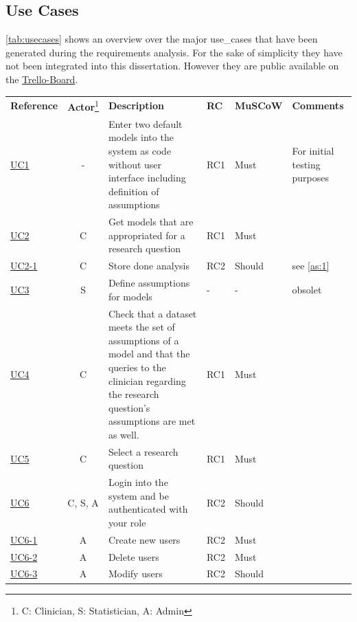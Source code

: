 \subsection{Use Cases}
\label{sub:use_cases}
\autoref{tab:usecases} shows an overview over the major \glspl{use_case} that have been generated during the requirements analysis. For the sake of simplicity they have not been integrated into this dissertation. However they are public available on the \href{https://trello.com/b/ywCkicpc}{Trello-Board}.

\begin{landscape}
	\begin{longtable}{ l c p{8cm} l l p{3cm} }
		\textbf{Reference}                         & \textbf{\gls{Actor}}\footnote{C: Clinician, S: Statistician, A: Admin} &\textbf{Description} &  \textbf{RC} & \textbf{MuSCoW} &  \textbf{Comments}\\
		\href{https://trello.com/c/KEOokZp9}{UC1}   & 	- & 	Enter two default models into the system as code without user interface including definition of assumptions & RC1 & Must &  For initial testing purposes  \\
		\href{https://trello.com/c/ebVrFdA5}{UC2}   & 	C & 	Get models that are appropriated for a research question & RC1	& Must &	   \\
		\href{https://trello.com/c/ORRBjISQ}{UC2-1} & 	C & 	Store done analysis & RC2 & Should &  see \autoref{as:1} \\
		\href{https://trello.com/c/qKLAoWRj}{UC3} 	&  	S & 	Define assumptions for models & - & - & obsolet \\
		\href{https://trello.com/c/7NINsfz8}{UC4}   & 	C & 	Check that a dataset meets the set of assumptions of a model and that the queries to the clinician regarding the research question's  assumptions are met as well. & RC1 & Must   &   \\
		\href{https://trello.com/c/22JGne3r}{UC5}   & 	C & 	Select a research question & RC1 & Must &   \\
		\href{https://trello.com/c/CVGBVWID}{UC6}   &   C, S, A & 	Login into the system and be authenticated with your role & RC2 & Should &	 \\
		\href{https://trello.com/c/pId27kJM}{UC6-1} &   A & 	Create new users & RC2 & Must &	 \\
		\href{https://trello.com/c/pQ98qgSL}{UC6-2} &  	A & 	Delete users & RC2 & Must	 &   \\
		\href{https://trello.com/c/mvxBeNSR}{UC6-3} &  	A & 	Modify users & RC2 & Should &   \\

\end{longtable}
\end{landscape}
